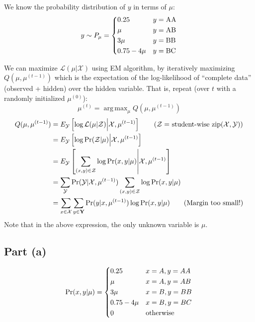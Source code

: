 \documentclass[11pt,a4paper,titlepage]{article}
\DeclareMathOperator*{\argmax}{arg\,max} %
\begin{document}
We know the probability distribution of $y$ in terms of $\mu$:
\[
    y \sim P_\mu =
    \begin{dcases}
        0.25 & y = \rm AA \\
        \mu & y = \rm AB \\
        3\mu & y = \rm BB \\
        0.75 - 4\mu & y = \rm BC
    \end{dcases}
\]

We can maximize $\mathcal{L}(\mu | \mathcal{X})$ using EM algorithm, by
iteratively maximizing $Q(\mu, \mu^{(t-1)})$ which is the expectation of the
log-likelihood of ``complete data'' (observed + hidden) over the hidden
variable. That is, repeat (over $t$ with a randomly initialized $\mu^{(0)}$):
\[
    \mu^{(t)} = \argmax_{\mu} Q(\mu, \mu^{(t-1)})
\]
\begin{align*}
    Q(\mu, \mu^{(t-1)}) &= E_{\mathcal{Y}} \left[ \log \mathcal{L}(\mu | \mathcal{Z})
                               \middle| \mathcal{X}, \mu^{(t-1)}
                               \right] \tag{$\mathcal{Z} =$ student-wise zip$(\mathcal{X, Y})$}\\
                        &= E_{\mathcal{Y}} \left[ \log \Pr(\mathcal{Z} | \mu)
                               \middle| \mathcal{X}, \mu^{(t-1)} \right] \\
                        &= E_{\mathcal{Y}} \left[ \sum_{(x, y) \in \mathcal{Z}} \log \Pr(x, y| \mu)
                               \middle| \mathcal{X}, \mu^{(t-1)} \right] \\
                        &= \sum_{\mathcal{Y}} \Pr(\mathcal{Y} | \mathcal{X}, \mu^{(t-1)})
                                              \sum_{(x, y) \in \mathcal{Z}} \log \Pr(x, y| \mu) \\
                        &= \sum_{x \in \mathcal{X}} \sum_{y \in \bf Y} \Pr (y | x, \mu^{(t-1)})
                                                        \log \Pr(x, y| \mu) \tag{Margin too small!}
\end{align*}
Note that in the above expression, the only unknown variable is $\mu$.

\subsection*{Part (a)}

\[
    \Pr(x, y | \mu) =
    \begin{dcases}
        0.25 & x = A, y = AA \\
        \mu & x = A, y = AB \\
        3\mu & x = B, y = BB \\
        0.75 - 4\mu & x = B, y = BC \\
        0 & \rm otherwise
    \end{dcases}
\]
\end{document}
